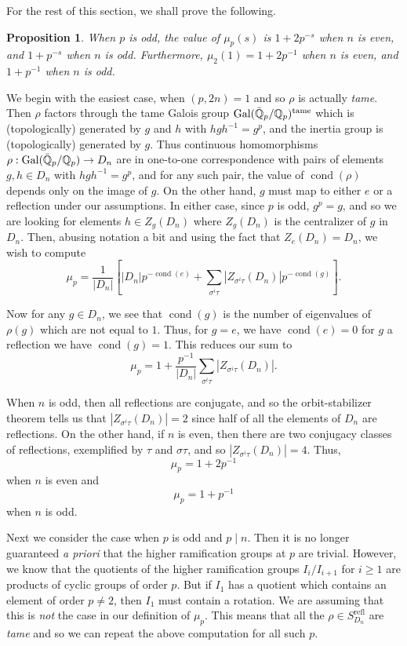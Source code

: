 \documentclass[11pt]{article}
\newcommand{\Gal}{\operatorname{Gal}}
\newcommand{\Qbar}{\Bar{\mathbb{Q}}}
\newcommand{\cond}{\operatorname{cond}}
\newcommand{\refl}{\mathrm{refl}}
\newcommand{\tame}{\mathrm{tame}}
\newcommand{\Q}{\mathbb{Q}}
\newtheorem{prop}[lem]{Proposition}
\theoremstyle{definition}
\begin{document}
For the rest of this section, we shall prove the following.

\begin{prop}
  When $p$ is odd, the value of $\mu_p(s)$ is $1 + 2p^{-s}$ when $n$ is even,
and $1 + p^{-s}$ when $n$ is odd. Furthermore, $\mu_2(1) = 1 + 2p^{-1}$ when
$n$ is even, and $1 + p^{-1}$ when $n$ is odd.
\end{prop}

We begin with the easiest case, when $(p, 2n) = 1$ and so $\rho$ is actually
{\em tame}.  Then $\rho$ factors through the tame Galois group
$\Gal(\Qbar_p/\Q_p)^\tame$ which is (topologically) generated by $g$ and $h$
with $hgh^{-1} = g^p$, and the inertia group is (topologically) generated by
$g$. Thus continuous homomorphisms $\rho : \Gal(\Qbar_p/\Q_p) \to D_n$ are in
one-to-one correspondence with pairs of elements $g, h \in D_n$ with $hgh^{-1}
= g^p$, and for any such pair, the value of $\cond(\rho)$ depends only on the
image of $g$.  On the other hand, $g$ must map to either $e$ or a reflection
under our assumptions. In either case, since $p$ is odd, $g^p = g$, and so we
are looking for elements $h \in Z_g(D_n)$ where $Z_g(D_n)$ is the centralizer
of $g$ in $D_n$. Then, abusing notation a bit and using the fact that $Z_e(D_n) = D_n$, we wish to compute
\[ \mu_p = \frac{1}{|D_n|} \left[ |D_n| p^{-\cond(e)} + \sum_{\sigma^i\tau} |Z_{\sigma^i\tau}(D_n)| p^{-\cond(g)}\right]. \]

Now for any $g \in D_n$, we see that $\cond(g)$ is the number of eigenvalues of
$\rho(g)$ which are not equal to $1$. Thus, for $g = e$, we have $\cond(e) = 0$
for $g$ a reflection we have $\cond(g) = 1$. This reduces our sum to 
\[ \mu_p = 1 + \frac{p^{-1}}{|D_n|} \sum_{\sigma^i\tau} |Z_{\sigma^i\tau}(D_n)|. \]

When $n$ is odd, then all reflections are conjugate, and so the
orbit-stabilizer theorem tells us that $|Z_{\sigma^i\tau}(D_n)| = 2$ since half
of all the elements of $D_n$ are reflections. On the other hand, if $n$ is
even, then there are two conjugacy classes of reflections, exemplified by $\tau$ and
$\sigma\tau$, and so $|Z_{\sigma^i\tau}(D_n)| = 4$. Thus,
\[ \mu_p = 1 + 2p^{-1} \]
when $n$ is even and
\[ \mu_p = 1 + p^{-1} \]
when $n$ is odd.

Next we consider the case when $p$ is odd and $p \mid n$. Then it is no longer
guaranteed {\em a priori} that the higher ramification groups at $p$ are
trivial. However, we know that the quotients of the higher ramification groups
$I_i/I_{i+1}$ for $i \geq 1$ are products of cyclic groups of order $p$. But if
$I_1$ has a quotient which contains an element of order $p \ne 2$, then $I_1$
must contain a rotation. We are assuming that this is {\em not} the case in our
definition of $\mu_p$. This means that all the $\rho \in S_{D_n}^\refl$ are
{\em tame} and so we can repeat the above computation for all such $p$.
\end{document}
